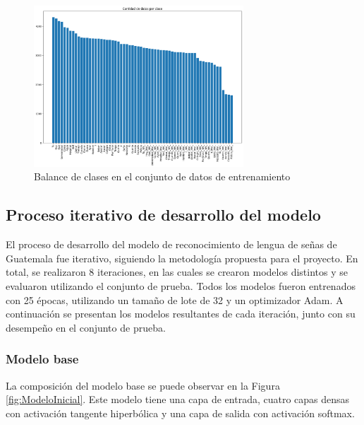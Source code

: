 \begin{figure}[H]
    \centering
    \includegraphics[width=0.7\textwidth]{figuras/DataBalance.png}
    \caption{Balance de clases en el conjunto de datos de entrenamiento}
    \label{fig:ClasesBalanceadas}
\end{figure}

\subsection{Proceso iterativo de desarrollo del modelo}
El proceso de desarrollo del modelo de reconocimiento de lengua de señas de Guatemala fue iterativo, siguiendo la metodología propuesta para el proyecto.
En total, se realizaron 8 iteraciones, en las cuales se crearon modelos distintos y se evaluaron utilizando el conjunto de prueba.
Todos los modelos fueron entrenados con 25 épocas, utilizando un tamaño de lote de 32 y un optimizador Adam. 
A continuación se presentan los modelos resultantes de cada iteración, junto con su desempeño en el conjunto de prueba.

\subsubsection{Modelo base}
La composición del modelo base se puede observar en la Figura \ref{fig:ModeloInicial}. 
Este modelo tiene una capa de entrada, cuatro capas densas con activación tangente hiperbólica y una capa de salida con activación softmax.

